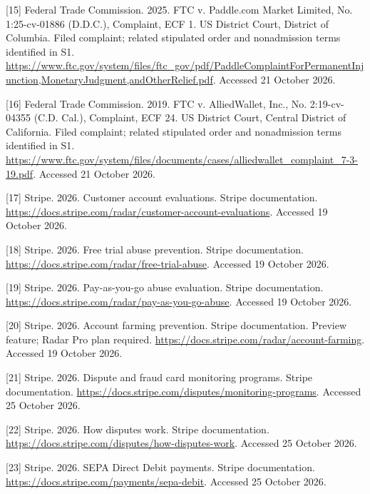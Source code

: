 \documentclass[
  11pt,
]{article}
\newlength{\cslhangindent}
\newlength{\cslentryspacingunit} %
\newenvironment{CSLReferences}[2] %
 {%
  \setlength{\parindent}{0pt}
  \ifodd #1
  \let\oldpar\par
  \def\par{\hangindent=\cslhangindent\oldpar}
  \fi
  \setlength{\parskip}{#2\cslentryspacingunit}
 }%
 {}
\begin{document}
\begin{CSLReferences}{1}{1}
\leavevmode{}%
{[}15{]} Federal Trade Commission. 2025. FTC v. Paddle.com Market
Limited, No. 1:25-cv-01886 (D.D.C.), Complaint, ECF 1. US District
Court, District of Columbia. Filed complaint; related stipulated order
and nonadmission terms identified in S1.
\url{https://www.ftc.gov/system/files/ftc_gov/pdf/PaddleComplaintForPermanentInjunction,MonetaryJudgment,andOtherRelief.pdf}.
Accessed 21 October 2026.

\leavevmode{}%
{[}16{]} Federal Trade Commission. 2019. FTC v. AlliedWallet, Inc., No.
2:19-cv-04355 (C.D. Cal.), Complaint, ECF 24. US District Court, Central
District of California. Filed complaint; related stipulated order and
nonadmission terms identified in S1.
\url{https://www.ftc.gov/system/files/documents/cases/alliedwallet_complaint_7-3-19.pdf}.
Accessed 21 October 2026.

\leavevmode{}%
{[}17{]} Stripe. 2026. Customer account evaluations. Stripe
documentation.
\url{https://docs.stripe.com/radar/customer-account-evaluations}.
Accessed 19 October 2026.

\leavevmode{}%
{[}18{]} Stripe. 2026. Free trial abuse prevention. Stripe
documentation. \url{https://docs.stripe.com/radar/free-trial-abuse}.
Accessed 19 October 2026.

\leavevmode{}%
{[}19{]} Stripe. 2026. Pay-as-you-go abuse evaluation. Stripe
documentation. \url{https://docs.stripe.com/radar/pay-as-you-go-abuse}.
Accessed 19 October 2026.

\leavevmode{}%
{[}20{]} Stripe. 2026. Account farming prevention. Stripe documentation.
Preview feature; Radar Pro plan required.
\url{https://docs.stripe.com/radar/account-farming}. Accessed 19 October
2026.

\leavevmode{}%
{[}21{]} Stripe. 2026. Dispute and fraud card monitoring programs.
Stripe documentation.
\url{https://docs.stripe.com/disputes/monitoring-programs}. Accessed 25
October 2026.

\leavevmode{}%
{[}22{]} Stripe. 2026. How disputes work. Stripe documentation.
\url{https://docs.stripe.com/disputes/how-disputes-work}. Accessed 25
October 2026.

\leavevmode{}%
{[}23{]} Stripe. 2026. SEPA Direct Debit payments. Stripe documentation.
\url{https://docs.stripe.com/payments/sepa-debit}. Accessed 25 October
2026.


\end{CSLReferences}
\end{document}
